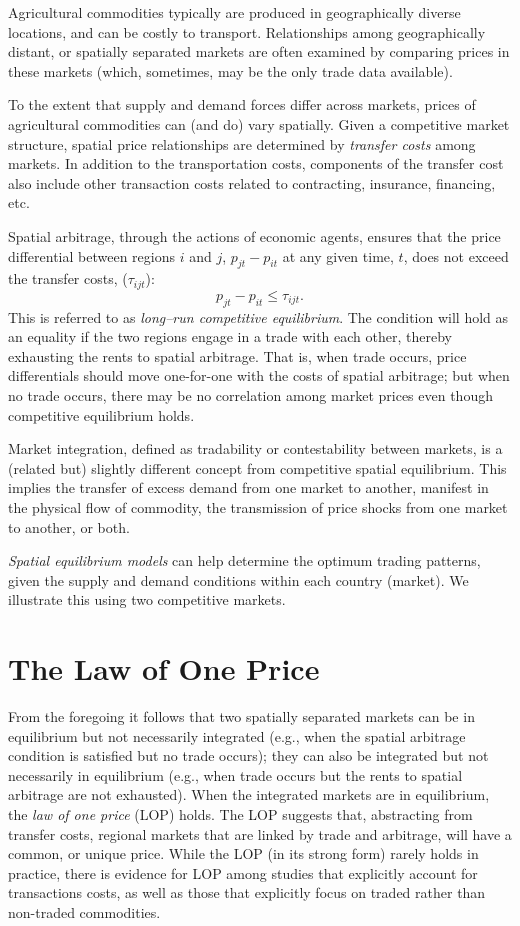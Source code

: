 \documentclass[
]{book}
\begin{document}
Agricultural commodities typically are produced in geographically diverse locations, and can be costly to transport. Relationships among geographically distant, or spatially separated markets are often examined by comparing prices in these markets (which, sometimes, may be the only trade data available).

To the extent that supply and demand forces differ across markets, prices of agricultural commodities can (and do) vary spatially. Given a competitive market structure, spatial price relationships are determined by \emph{transfer costs} among markets. In addition to the transportation costs, components of the transfer cost also include other transaction costs related to contracting, insurance, financing, etc.

Spatial arbitrage, through the actions of economic agents, ensures that the price differential between regions \(i\) and \(j\), \(p_{jt}-p_{it}\) at any given time, \(t\), does not exceed the transfer costs, (\(\tau_{ijt}\)): \[p_{jt}-p_{it} \le \tau_{ijt}.\] This is referred to as \emph{long--run competitive equilibrium}. The condition will hold as an equality if the two regions engage in a trade with each other, thereby exhausting the rents to spatial arbitrage. That is, when trade occurs, price differentials should move one-for-one with the costs of spatial arbitrage; but when no trade occurs, there may be no correlation among market prices even though competitive equilibrium holds.

Market integration, defined as tradability or contestability between markets, is a (related but) slightly different concept from competitive spatial equilibrium. This implies the transfer of excess demand from one market to another, manifest
in the physical flow of commodity, the transmission of price shocks from one market to another, or both.

\emph{Spatial equilibrium models} can help determine the optimum trading patterns, given the supply and demand conditions within each country (market). We illustrate this using two competitive markets.

\hypertarget{the-law-of-one-price}{%
\section{The Law of One Price}\label{the-law-of-one-price}}

From the foregoing it follows that two spatially separated markets can be in equilibrium but not necessarily integrated (e.g., when the spatial arbitrage condition is satisfied but no trade occurs); they can also be integrated but not necessarily in equilibrium (e.g., when trade occurs but the rents to spatial arbitrage are not exhausted). When the integrated markets are in equilibrium, the \emph{law of one price} (LOP) holds. The LOP suggests that, abstracting from transfer costs, regional markets that are linked by trade and arbitrage, will have a common, or unique price. While the LOP (in its strong form) rarely holds in practice, there is evidence for LOP among studies that explicitly account for transactions costs, as well as those that explicitly focus on traded rather than non-traded commodities.
\end{document}
